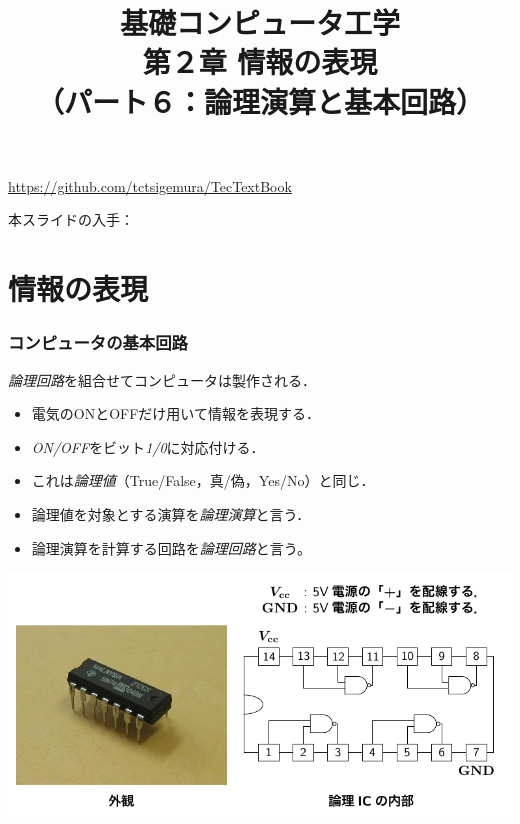 \documentclass[handout]{beamer}        %
\begin{document}
\title{基礎コンピュータ工学\\第２章 情報の表現\\
      （パート６：論理演算と基本回路）}
\date{}

\begin{frame}
  \titlepage
  \centerline{\url{https://github.com/tctsigemura/TecTextBook}}
  \vfill
  \centerline{本スライドの入手：
    }
\end{frame}


\section{情報の表現}
\begin{frame}
  \frametitle{コンピュータの基本回路}
  \emph{論理回路}を組合せてコンピュータは製作される．
  \begin{itemize}
  \item 電気のONとOFFだけ用いて情報を表現する．
  \item \emph{ON/OFF}をビット\emph{1/0}に対応付ける．
  \item これは\emph{論理値}（True/False，真/偽，Yes/No）と同じ．
  \item 論理値を対象とする演算を\emph{論理演算}と言う．
  \item 論理演算を計算する回路を\emph{論理回路}と言う。
  \end{itemize}
  \vfill
  \centerline{\includegraphics[scale=0.7]{../Tikz/lic.pdf}}
\end{frame}
\end{document}
